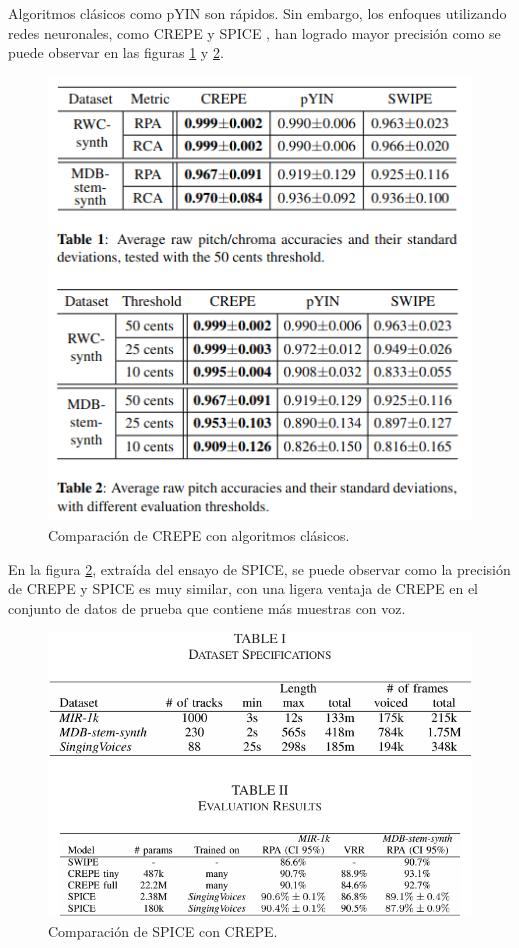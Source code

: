 Algoritmos clásicos como pYIN \cite{pYIN} son rápidos. Sin embargo, los enfoques utilizando redes neuronales, como CREPE \cite{CREPE} y SPICE \cite{SPICE}, han logrado mayor precisión como se puede observar en las figuras \ref{fig:crepecomparison} y \ref{fig:spicecomparison}.

\begin{figure}[h!]
	\centering
	\includegraphics[width=0.7\linewidth]{logos/crepe_comparison}
	\caption{Comparación de CREPE con algoritmos clásicos\protect\footnotemark.}
	\label{fig:crepecomparison}
\end{figure}


En la figura \ref{fig:spicecomparison}, extraída del ensayo de SPICE, se puede observar como la precisión de CREPE y SPICE es muy similar, con una ligera ventaja de CREPE en el conjunto de datos de prueba que contiene más muestras con voz.

\begin{figure}[h!]
	\centering
	\includegraphics[width=0.7\linewidth]{logos/spice_comparison}
	\caption{Comparación de SPICE con CREPE\protect\footnotemark.}
	\label{fig:spicecomparison}
\end{figure}

